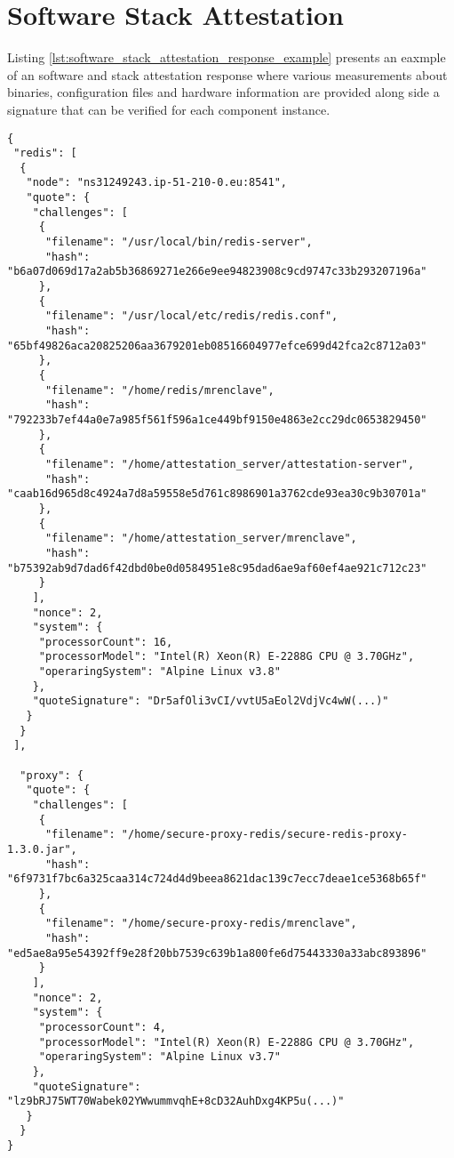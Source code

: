 \chapter{Software Stack Attestation}
\label{ann:software_stack_attestation_response_example}

Listing \ref{lst:software_stack_attestation_response_example} presents an eaxmple of an software and stack attestation response where various measurements about binaries, configuration files and hardware information are provided along side a signature that can be verified for each component instance.

\begin{lstlisting}
{
 "redis": [
  {
   "node": "ns31249243.ip-51-210-0.eu:8541",
   "quote": {
    "challenges": [
     {
      "filename": "/usr/local/bin/redis-server",
      "hash": "b6a07d069d17a2ab5b36869271e266e9ee94823908c9cd9747c33b293207196a"
     },
     {
      "filename": "/usr/local/etc/redis/redis.conf",
      "hash": "65bf49826aca20825206aa3679201eb08516604977efce699d42fca2c8712a03"
     },
     {
      "filename": "/home/redis/mrenclave",
      "hash": "792233b7ef44a0e7a985f561f596a1ce449bf9150e4863e2cc29dc0653829450"
     },
     {
      "filename": "/home/attestation_server/attestation-server",
      "hash": "caab16d965d8c4924a7d8a59558e5d761c8986901a3762cde93ea30c9b30701a"
     },
     {
      "filename": "/home/attestation_server/mrenclave",
      "hash": "b75392ab9d7dad6f42dbd0be0d0584951e8c95dad6ae9af60ef4ae921c712c23"
     }
    ],
    "nonce": 2,
    "system": {
     "processorCount": 16,
     "processorModel": "Intel(R) Xeon(R) E-2288G CPU @ 3.70GHz",
     "operaringSystem": "Alpine Linux v3.8"
    },
    "quoteSignature": "Dr5afOli3vCI/vvtU5aEol2VdjVc4wW(...)"
   }
  }
 ],
    
  "proxy": {
   "quote": {
    "challenges": [
     {
      "filename": "/home/secure-proxy-redis/secure-redis-proxy-1.3.0.jar",
      "hash": "6f9731f7bc6a325caa314c724d4d9beea8621dac139c7ecc7deae1ce5368b65f"
     },
     {
      "filename": "/home/secure-proxy-redis/mrenclave",
      "hash": "ed5ae8a95e54392ff9e28f20bb7539c639b1a800fe6d75443330a33abc893896"
     }
    ],
    "nonce": 2,
    "system": {
     "processorCount": 4,
     "processorModel": "Intel(R) Xeon(R) E-2288G CPU @ 3.70GHz",
     "operaringSystem": "Alpine Linux v3.7"
    },
    "quoteSignature": "lz9bRJ75WT70Wabek02YWwummvqhE+8cD32AuhDxg4KP5u(...)"
   }
  }
}
\end{lstlisting}